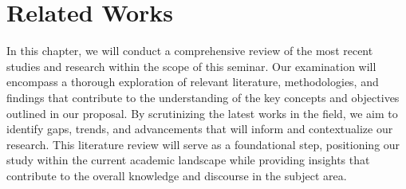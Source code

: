 \chapter{Related Works}
\label{chap:RelatedWork}


In this chapter, we will conduct a comprehensive review of the most recent studies and research within the scope of this seminar. Our examination will encompass a thorough exploration of relevant literature, methodologies, and findings that contribute to the understanding of the key concepts and objectives outlined in our proposal. By scrutinizing the latest works in the field, we aim to identify gaps, trends, and advancements that will inform and contextualize our research. This literature review will serve as a foundational step, positioning our study within the current academic landscape while providing insights that contribute to the overall knowledge and discourse in the subject area.